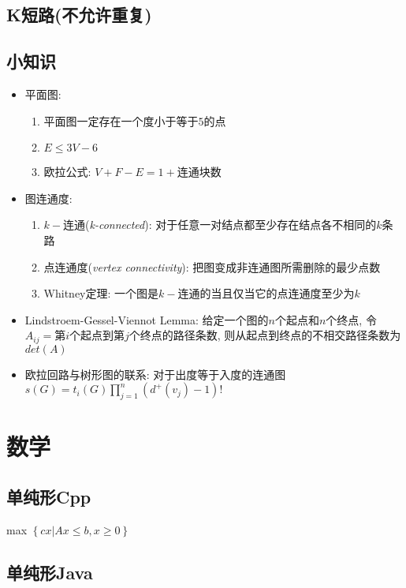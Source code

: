 \documentclass[landscape, twocolumn, 8pt, a4paper, twoside]{extarticle}
\begin{document}
  \subsection{K短路(不允许重复)}
    
  
  \subsection{小知识}
  \begin{itemize}
  \item 平面图: 
    \begin{enumerate}
    \item 平面图一定存在一个度小于等于$5$的点
    \item $E \le 3V - 6$
    \item 欧拉公式: $V + F - E = 1 + \mbox{连通块数}$
    \end{enumerate}
  \item 图连通度: 
    \begin{enumerate}
    \item $k-$连通(\emph{k-connected}): 对于任意一对结点都至少存在结点各不相同的$k$条路
    \item 点连通度(\emph{vertex connectivity}): 把图变成非连通图所需删除的最少点数
    \item Whitney定理: 一个图是$k-$连通的当且仅当它的点连通度至少为$k$
    \end{enumerate}
  \item Lindstroem-Gessel-Viennot Lemma:
    给定一个图的$n$个起点和$n$个终点, 
    令$A_{ij} = $第$i$个起点到第$j$个终点的路径条数,
    则从起点到终点的不相交路径条数为 $det(A)$
  \item 欧拉回路与树形图的联系: 
    对于出度等于入度的连通图
    $s(G) = t_i(G) \prod_{j = 1}^{n} (d^+(v_j) - 1)! $
  \end{itemize}

\section{数学}
  \subsection{单纯形Cpp}
    max $\left \{ cx | Ax \le b, x \ge 0 \right \}$
    
  \subsection{单纯形Java}
    
\end{document}
